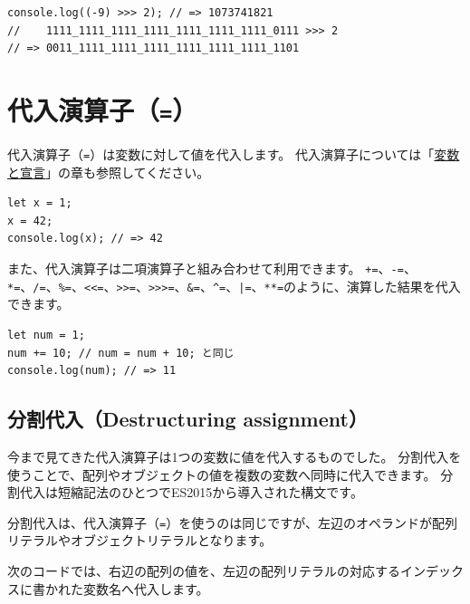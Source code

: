 \begin{lstlisting}
console.log((-9) >>> 2); // => 1073741821
//    1111_1111_1111_1111_1111_1111_1111_0111 >>> 2
// => 0011_1111_1111_1111_1111_1111_1111_1101
\end{lstlisting}

\hypertarget{assignment-operator}{%
\section{\texorpdfstring{代入演算子（\texttt{=}）}{代入演算子（=）}}\label{assignment-operator}}

代入演算子（\texttt{=}）は変数に対して値を代入します。
代入演算子については「\hyperlink{variable-and-declaration}{変数と宣言}」の章も参照してください。

\begin{lstlisting}
let x = 1;
x = 42;
console.log(x); // => 42
\end{lstlisting}

また、代入演算子は二項演算子と組み合わせて利用できます。
\lstinline{+=}、\lstinline{-=}、\lstinline{*=}、\lstinline{/=}、\lstinline{%=}、\lstinline{<<=}、\lstinline{>>=}、\lstinline{>>>=}、\lstinline{&=}、\lstinline{^=}、\lstinline{|=}、\lstinline{**=}のように、演算した結果を代入できます。

\begin{lstlisting}
let num = 1;
num += 10; // num = num + 10; と同じ
console.log(num); // => 11
\end{lstlisting}

\hypertarget{destructuring-assignment}{%
\subsection[分割代入（Destructuring
assignment）]{分割代入（Destructuring
assignment）\protect{}}\label{destructuring-assignment}}

今まで見てきた代入演算子は1つの変数に値を代入するものでした。
分割代入を使うことで、配列やオブジェクトの値を複数の変数へ同時に代入できます。
分割代入は短縮記法のひとつでES2015から導入された構文です。

分割代入は、代入演算子（\texttt{=}）を使うのは同じですが、左辺のオペランドが配列リテラルやオブジェクトリテラルとなります。

次のコードでは、右辺の配列の値を、左辺の配列リテラルの対応するインデックスに書かれた変数名へ代入します。

